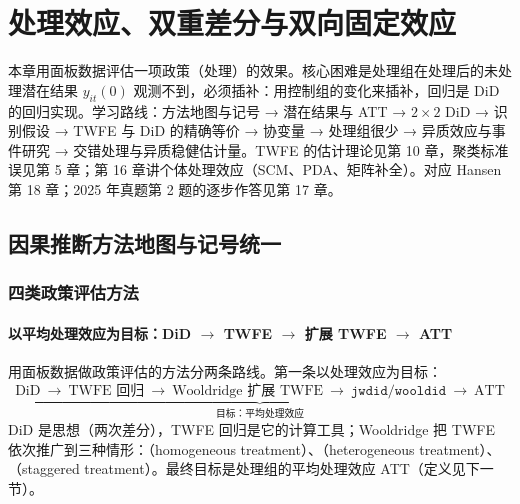 \chapter{处理效应、双重差分与双向固定效应}
\label{ch:U15a-did}

本章用面板数据评估一项政策（处理）的效果。核心困难是处理组在处理后的未处理潜在结果 $y_{it}(0)$ 观测不到，必须插补：用控制组的变化来插补，回归是 DiD 的回归实现。学习路线：方法地图与记号 → 潜在结果与 ATT → $2\times2$ DiD → 识别假设 → TWFE 与 DiD 的精确等价 → 协变量 → 处理组很少 → 异质效应与事件研究 → 交错处理与异质稳健估计量。TWFE 的估计理论见第 10 章，聚类标准误见第 5 章；第 16 章讲个体处理效应（SCM、PDA、矩阵补全）。对应 Hansen 第 18 章；2025 年真题第 2 题的逐步作答见第 17 章。

\section{因果推断方法地图与记号统一}\label{sec:U15a-map}

\subsection{四类政策评估方法}

\subsubsection{以平均处理效应为目标：DiD \texorpdfstring{$\to$}{->} TWFE \texorpdfstring{$\to$}{->} 扩展 TWFE \texorpdfstring{$\to$}{->} ATT}

用面板数据做政策评估的方法分两条路线。第一条以处理效应为目标：
\[
\underbrace{\text{DiD}\ \longrightarrow\ \text{TWFE 回归}\ \longrightarrow\ \text{Wooldridge 扩展 TWFE}\ \longrightarrow\ \texttt{jwdid}/\texttt{wooldid}\ \longrightarrow\ \text{ATT}}_{\text{目标：平均处理效应}}
\]
DiD 是思想（两次差分），TWFE 回归是它的计算工具；Wooldridge 把 TWFE 依次推广到三种情形：（homogeneous treatment）、（heterogeneous treatment）、（staggered treatment）。最终目标是处理组的平均处理效应 ATT（定义见下一节）。

